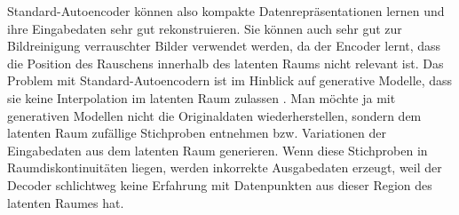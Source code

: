 Standard-Autoencoder können also kompakte Datenrepräsentationen lernen und ihre Eingabedaten sehr gut rekonstruieren. Sie können auch sehr gut zur Bildreinigung verrauschter Bilder verwendet werden, da der Encoder lernt, dass die Position des Rauschens innerhalb des latenten Raums nicht relevant ist. Das Problem mit Standard-Autoencodern ist im Hinblick auf generative Modelle, dass sie keine Interpolation im latenten Raum zulassen \cite{Spi2018}. Man möchte ja mit generativen Modellen nicht die Originaldaten wiederherstellen, sondern dem latenten Raum zufällige Stichproben entnehmen bzw. Variationen der Eingabedaten aus dem latenten Raum generieren. Wenn diese Stichproben in Raumdiskontinuitäten liegen, werden inkorrekte Ausgabedaten erzeugt, weil der Decoder schlichtweg keine Erfahrung mit Datenpunkten aus dieser Region des latenten Raumes hat.

